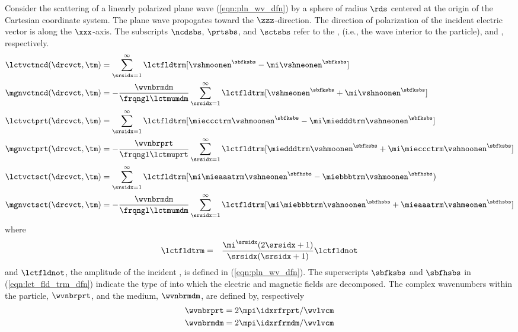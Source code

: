 \documentclass[12pt]{article}
\begin{document}
Consider the scattering of a linearly polarized plane wave
(\ref{eqn:pln_wv_dfn}) by a sphere of radius $\rds$ centered at the
origin of the Cartesian coordinate system.  
The plane wave propogates toward the $\zzz$-direction. 
The direction of polarization of the incident electric vector is along 
the $\xxx$-axis.
The subscripts $\ncdsbs$, $\prtsbs$, and $\sctsbs$ refer to the 
,  (i.e., the wave
interior to the particle), and , respectively.
\begin{subequations}
\label{eqn:lct_mgn_fld_dfn}
\begin{align}
\label{eqn:lct_fld_ncd_dfn}
\lctvctncd(\drcvct,\tm) & = \sum_{\srsidx=1}^{\infty} 
\lctfldtrm [ \vshmoonen^{\sbfksbs} - \mi \vshneonen^{\sbfksbs} ] \\
\label{eqn:mgn_fld_ncd_dfn}
\mgnvctncd(\drcvct,\tm) & = -\frac{\wvnbrmdm}{\frqngl \lctmumdm}
\sum_{\srsidx=1}^{\infty} \lctfldtrm [ \vshmeonen^{\sbfksbs} + \mi
\vshnoonen^{\sbfksbs} ] \\
\label{eqn:lcd_fld_prt_dfn}
\lctvctprt(\drcvct,\tm) & = \sum_{\srsidx=1}^{\infty} 
\lctfldtrm [ \mieccctrm \vshmoonen^{\sbfksbs} - 
\mi \miedddtrm \vshneonen^{\sbfksbs} ] \\
\label{eqn:mgn_fld_prt_dfn}
\mgnvctprt(\drcvct,\tm) & = -\frac{\wvnbrprt}{\frqngl \lctmuprt}
\sum_{\srsidx=1}^{\infty} \lctfldtrm [ \miedddtrm \vshmoonen^{\sbfksbs} 
+ \mi \mieccctrm \vshnoonen^{\sbfksbs} ] \\
\label{eqn:lct_fld_sct_dfn}
\lctvctsct(\drcvct,\tm) & = \sum_{\srsidx=1}^{\infty} 
\lctfldtrm [ \mi \mieaaatrm \vshneonen^{\sbfhsbs} - 
\miebbbtrm \vshmoonen^{\sbfhsbs} ) \\
\label{eqn:mgn_fld_sct_dfn}
\mgnvctsct(\drcvct,\tm) & = -\frac{\wvnbrmdm}{\frqngl \lctmumdm}
\sum_{\srsidx=1}^{\infty} \lctfldtrm [ \mi \miebbbtrm \vshnoonen^{\sbfhsbs} 
+ \mieaaatrm \vshmeonen^{\sbfhsbs} ]
\end{align}
\end{subequations} 
where 
\begin{eqnarray}
\lctfldtrm & = & \frac{\mi^{\srsidx}(2\srsidx + 1)}
{\srsidx(\srsidx + 1)} \lctfldnot
\label{eqn:lct_fld_trm_dfn}
\end{eqnarray}
and $\lctfldnot$, the amplitude of the incident 
, is defined in (\ref{eqn:pln_wv_dfn}). 
The superscripts $\sbfksbs$ and $\sbfhsbs$ in
(\ref{eqn:lct_fld_trm_dfn}) indicate the type of  into which the electric and magnetic fields are
decomposed.
The complex wavenumbers within the particle, $\wvnbrprt$, and the
medium, $\wvnbrmdm$, are defined by, respectively
\begin{subequations}
\label{eqn:wvnbrmie_dfn}
\begin{align}
\label{eqn:wvnbrprt_dfn}
\wvnbrprt & = 2 \mpi \idxrfrprt / \wvlvcm \\
\label{eqn:wvnbrmdm_dfn}
\wvnbrmdm & = 2 \mpi \idxrfrmdm / \wvlvcm
\end{align}
\end{subequations} 
\end{document}
